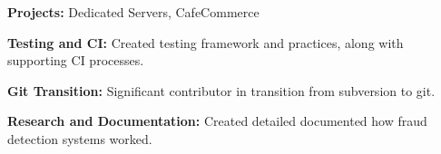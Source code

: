 \item \textbf{Projects:} Dedicated Servers, CafeCommerce

\item \textbf{Testing and CI:} Created testing framework and practices, along with supporting CI processes. %
\item \textbf{Git Transition:} Significant contributor in transition from subversion to git.
\item \textbf{Research and Documentation:} Created detailed documented how fraud detection systems worked.

